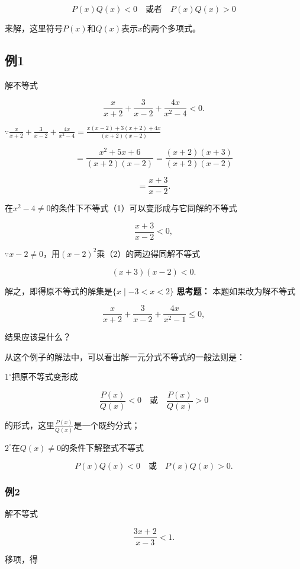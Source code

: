 \[
P (x) Q (x) < 0 \quad \text{或者} \quad P (x) Q (x) > 0
\]

来解，这里符号\(P(x)\)和\(Q(x)\)表示\(x\)的两个多项式。

\subsection{例1}

解不等式

\[
\frac{x}{x + 2} + \frac{3}{x - 2} + \frac{4 x}{x^{2} - 4} < 0. \tag {1}
\]

\(\because \frac{x}{x + 2} + \frac{3}{x - 2} + \frac{4x}{x^2-4} = \frac{x(x - 2) + 3(x + 2) + 4x}{(x + 2)(x - 2)}\)

\[
= \frac{x^{2} + 5 x + 6}{(x + 2) (x - 2)} = \frac{(x + 2) (x + 3)}{(x + 2) (x - 2)}
\]

\[
= \frac{x + 3}{x - 2}.
\]

在\(x^{2} - 4 \neq 0\)的条件下不等式（1）可以变形成与它同解的不等式

\[
\frac{x + 3}{x - 2} < 0, \tag {2}
\]

\(\because x - 2 \neq 0\)，用\((x - 2)^{2}\)乘（2）的两边得同解不等式

\[
(x + 3) (x - 2) < 0. \tag {3}
\]

解之，即得原不等式的解集是\(\{x\mid -3 < x < 2\}\) \textbf{思考题：}
本题如果改为解不等式

\[
\frac{x}{x + 2} + \frac{3}{x - 2} + \frac{4 x}{x^{2} - 1} \leqslant 0,
\]

结果应该是什么？

从这个例子的解法中，可以看出解一元分式不等式的一般法则是：

\(1^{\circ}\)把原不等式变形成

\[
\frac{P (x)}{Q (x)} < 0 \quad \text{或} \quad \frac{P (x)}{Q (x)} > 0
\]

的形式，这里\(\frac{P(x)}{Q(x)}\)是一个既约分式；

\(2^{\circ}\)在\(Q(x) \neq 0\)的条件下解整式不等式

\[
P (x) Q (x) < 0 \quad \text{或} \quad P (x) Q (x) > 0.
\]

\subsubsection{例2}

解不等式

\[
\frac{3 x + 2}{x - 3} < 1. \tag {1}
\]

 移项，得

